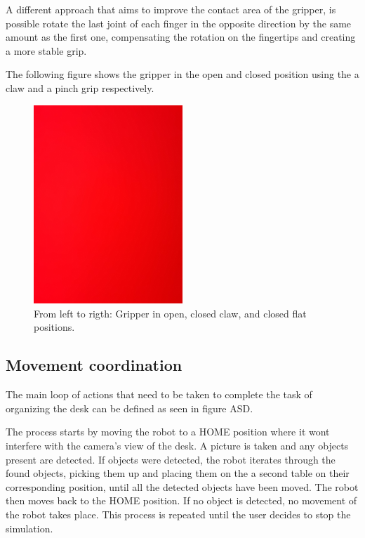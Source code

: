 A different approach that aims to improve the contact area of the gripper, is possible rotate the last joint of each finger in the opposite direction by the same amount as the first one, compensating the rotation on the fingertips and creating a more stable grip.

The following figure shows the gripper in the open and closed position using the a claw and a pinch grip respectively.

\begin{figure}[!h]
    \centering
    \includegraphics[width=0.5\textwidth]{Figures/red_color.jpg}
    \caption{From left to rigth: Gripper in open, closed claw, and closed flat positions.}
    \label{fig:gripper_states}
\end{figure}

\subsection{Movement coordination}

The main loop of actions that need to be taken to complete the task of organizing the desk can be defined as seen in figure ASD. 

The process starts by moving the robot to a HOME position where it wont interfere with the camera's view of the desk. A picture is taken and any objects present are detected. If objects were detected, the robot iterates through the found objects, picking them up and placing them on the a second table on their corresponding position, until all the detected objects have been moved. The robot then moves back to the HOME position. If no object is detected, no movement of the robot takes place. This process is repeated until the user decides to stop the simulation.


